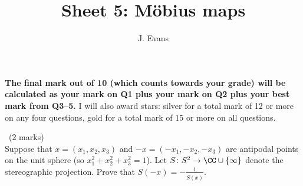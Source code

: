 \documentclass[12pt]{article}
\title{Sheet 5: M\"obius maps}
\author{J. Evans}
\date{}
\begin{document}
\maketitle

\bigskip

{\bf The final mark out of 10 (which counts towards your grade) will be calculated as your mark on Q1 plus your mark on Q2 plus your best mark from Q3--5.} I will also award stars: silver for a total mark of 12 or more on any four questions, gold for a total mark of 15 or more on all questions.

\vspace{1cm}

\begin{question}\ (2 marks)\\
Suppose that $x=(x_1,x_2,x_3)$ and $-x=(-x_1,-x_2,-x_3)$ are antipodal points on the unit sphere (so $x_1^2+x_2^2+x_3^2=1$). Let $S\colon S^2\to\CC\cup\{\infty\}$ denote the stereographic projection. Prove that $S(-x)=-\frac{1}{\overline{S(x)}}$.
\end{question}

\iffalse
\begin{answer}
  We have $S(x)=\frac{x_1+ix_2}{1-x_3}$ so
  \begin{align*}
    S(-x)&=\frac{-(x_1+ix_2)}{1+x_3}\\
    -\frac{1}{\overline{S(x)}}&=-\frac{1-x_3}{x_1-ix_2}\\
    &=\frac{-(x_1+ix_2)(1-x_3)}{x_1^2+x_2^2}\\
    &=\frac{-(x_1+ix_2)}{1+x_3}\frac{1-x_3}{1-x_3}
  \end{align*}
  where we have used $x_1^2+x_2^2=1-x_3^2=(1-x_3)(1+x_3)$.
\end{answer}
\newpage
\fi

\vspace{1cm}
\end{document}
